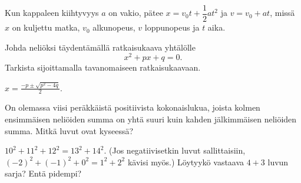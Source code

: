 \begin{tehtavasivu}
\begin{tehtava}
    Kun kappaleen kiihtyvyys $a$ on vakio, pätee $x = v_0t + \dfrac{1}{2}at^2$ ja $v = v_0 + at$, missä $x$ on kuljettu matka, $v_0$ alkunopeus, $v$ loppunopeus ja $t$ aika.
		\begin{alakohdat}
        \end{alakohdat}
    \begin{vastaus}
        \begin{alakohdat}
        \end{alakohdat}
    \end{vastaus}
\end{tehtava}

\begin{tehtava}
	Johda neliöksi täydentämällä ratkaisukaava yhtälölle
	\[ x^2 +px+q=0. \]
	Tarkista sijoittamalla tavanomaiseen ratkaisukaavaan.
	\begin{vastaus}
		$x=\frac{-p \pm \sqrt{p^2-4q}}{2}$.
	\end{vastaus}
\end{tehtava}

\begin{tehtava} %
On olemassa viisi peräkkäistä positiivista kokonaislukua, joista kolmen ensimmäisen neliöiden summa on yhtä suuri kuin kahden jälkimmäisen neliöiden summa. Mitkä luvut ovat kyseessä?
    \begin{vastaus}
		$10^2+11^2+12^2 = 13^2 + 14^2$.
    	(Jos negatiivisetkin luvut sallittaisiin, $(-2)^2+(-1)^2+0^2 = 1^2 + 2^2$ kävisi myös.) Löytyykö vastaava $4 + 3$ luvun sarja? Entä pidempi?
    \end{vastaus}
\end{tehtava}


\end{tehtavasivu}
